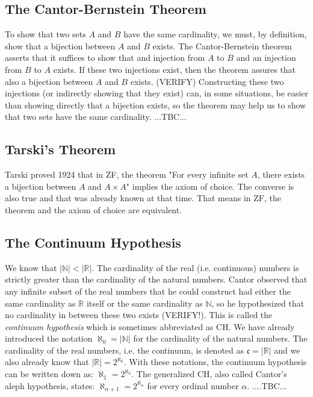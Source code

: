 \subsection{The Cantor-Bernstein Theorem}
To show that two sets $A$ and $B$ have the same cardinality, we must, by definition, show that a bijection between $A$ and $B$ exists. The Cantor-Bernstein theorem asserts that it suffices to show that and injection from $A$ to $B$ and an injection from $B$ to $A$ exists. If these two injections exist, then the theorem assures that also a bijection between $A$ and $B$ exists. (VERIFY) Constructing these two injections (or indirectly showing that they exist) can, in some situations, be easier than showing directly that a bijection exists, so the theorem may help us to show that two sets have the same cardinality. ...TBC...


\subsection{Tarski's Theorem}
Tarski proved 1924 that in ZF, the theorem "For every infinite set $A$, there exists a bijection between $A$ and $A \times A$" implies the axiom of choice. The converse is also true and that was already known at that time. That means in ZF, the theorem and the axiom of choice are equivalent. 


\subsection{The Continuum Hypothesis}
We know that $|\mathbb{N}| < |\mathbb{R}|$. The cardinality of the real (i.e. continuous) numbers is strictly greater than the cardinality of the natural numbers. Cantor observed that any infinite subset of the real numbers that he could construct had either the same cardinality as $\mathbb{R}$ itself or the same cardinality as $\mathbb{N}$, so he hypothesized that no cardinality in between these two exists (VERIFY!). This is called the \emph{continuum hypothesis} which is sometimes abbreviated as CH. We have already introduced the notation $\aleph_0 = |\mathbb{N}|$ for the cardinality of the natural numbers. The cardinality of the real numbers, i.e. the continuum, is denoted as $\mathfrak{c} = |\mathbb{R}|$ and we also already know that $|\mathbb{R}| = 2^{\aleph_0}$. With these notations, the continuum hypothesis can be written down as: $\aleph_1 = 2^{\aleph_0}$. The generalized CH, also called Cantor's aleph hypothesis, states: $\aleph_{\alpha+1} = 2^{\aleph_{\alpha}}$ for every ordinal number $\alpha$. ....TBC...

